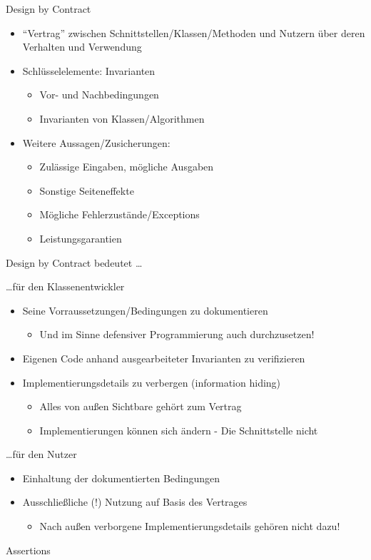 \begin{frame}{Design by Contract}
	\begin{itemize}
		\item \enquote{Vertrag} zwischen Schnittstellen/Klassen/Methoden und Nutzern über deren Verhalten und Verwendung
		\item Schlüsselelemente: Invarianten
		\begin{itemize}
			\item Vor- und Nachbedingungen
			\item Invarianten von Klassen/Algorithmen
		\end{itemize}
		\item Weitere Aussagen/Zusicherungen:
		\begin{itemize}
			\item Zulässige Eingaben, mögliche Ausgaben
			\item Sonstige Seiteneffekte
			\item Mögliche Fehlerzustände/Exceptions
			\item Leistungsgarantien
		\end{itemize}
	\end{itemize}
\end{frame}

\begin{frame}{Design by Contract bedeutet \dots}
	\begin{block}{\dots für den Klassenentwickler}
		\begin{itemize}
			\item Seine Vorraussetzungen/Bedingungen zu dokumentieren
			\begin{itemize}
				\item Und im Sinne defensiver Programmierung auch durchzusetzen!
			\end{itemize}
			\item Eigenen Code anhand ausgearbeiteter Invarianten zu verifizieren
			\item Implementierungsdetails zu verbergen (information hiding)
			\begin{itemize}
				\item Alles von außen Sichtbare gehört zum Vertrag
				\item Implementierungen können sich ändern - Die Schnittstelle nicht
			\end{itemize}
		\end{itemize}
	\end{block}
	\begin{block}{\dots für den Nutzer}
		\begin{itemize}
			\item Einhaltung der dokumentierten Bedingungen
			\item Ausschließliche (!) Nutzung auf Basis des Vertrages
			\begin{itemize}
				\item Nach außen verborgene Implementierungsdetails gehören nicht dazu!
			\end{itemize}
		\end{itemize}		
	\end{block}
\end{frame}

\begin{frame}{Assertions}

\end{frame}

